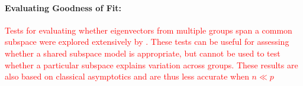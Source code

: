 \documentclass{statsoc}
\newcommand{\tr}{\text{tr}}
\newcommand{\edits}[1]{{\textsf{\textcolor{red}{#1}}}}
\newcommand{\edits}[1]{#1}
\begin{document}


\paragraph{Evaluating Goodness of Fit:}

\edits{Tests for evaluating whether eigenvectors from multiple groups
  span a common subspace were explored extensively by
  \citet{schott1991some}.  These tests can be useful for assessing
  whether a shared subspace model is appropriate, but cannot
  be used to test whether a particular subspace explains
  variation across groups.  These results are also based
  on classical asymptotics and are thus less accurate when
  $n \ll p$}
\end{document}
